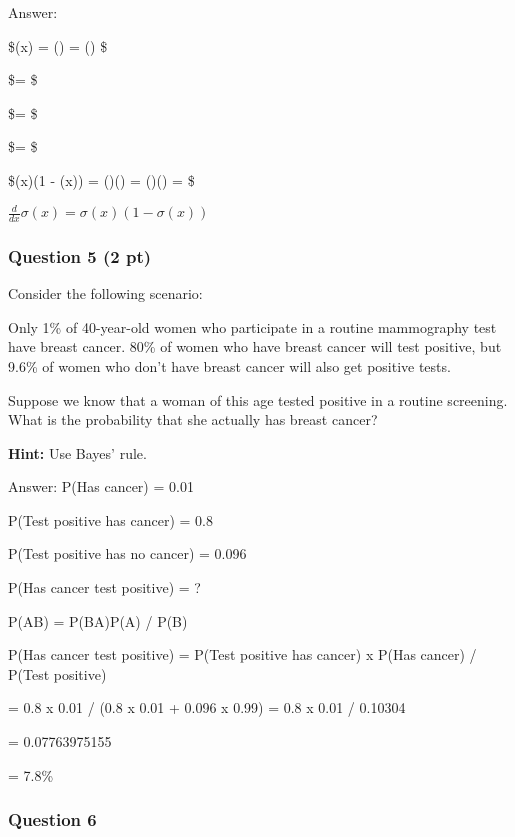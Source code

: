 \documentclass[11pt]{article}
\begin{document}
    Answer:

\$\sigma(x) = () =
() \$

\$=  \$

\$=  \$

\$=  \$

\$\sigma(x)(1 - \sigma(x)) = ()() =
()() =  \$

\(\frac{d}{dx}\sigma(x) = \sigma(x)(1 - \sigma(x))\)

    \subsubsection{Question 5 (2 pt)}\label{question-5-2-pt}

Consider the following scenario:

Only 1\% of 40-year-old women who participate in a routine mammography
test have breast cancer. 80\% of women who have breast cancer will test
positive, but 9.6\% of women who don't have breast cancer will also get
positive tests.

Suppose we know that a woman of this age tested positive in a routine
screening. What is the probability that she actually has breast cancer?

\textbf{Hint:} Use Bayes' rule.

    Answer: P(Has cancer) = 0.01

P(Test positive \textbar{} has cancer) = 0.8

P(Test positive \textbar{} has no cancer) = 0.096

P(Has cancer \textbar{} test positive) = ?

P(A\textbar{}B) = P(B\textbar{}A)P(A) / P(B)

P(Has cancer \textbar{} test positive) = P(Test positive \textbar{} has
cancer) x P(Has cancer) / P(Test positive)

= 0.8 x 0.01 / (0.8 x 0.01 + 0.096 x 0.99) = 0.8 x 0.01 / 0.10304

= 0.07763975155

= 7.8\%

    \subsubsection{Question 6}\label{question-6}
\end{document}
